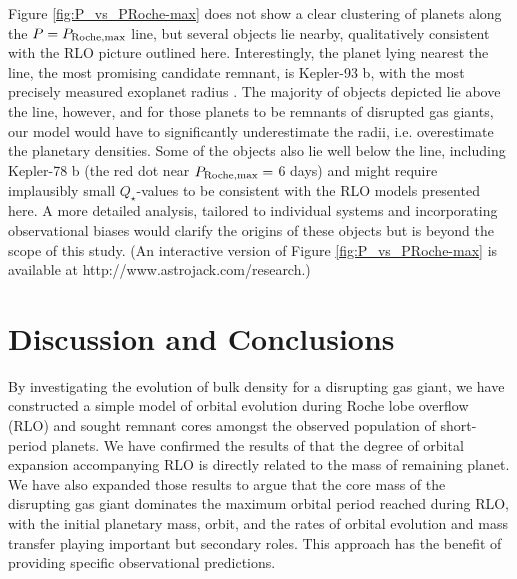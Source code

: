 \documentclass{svjour3}                     %
\begin{document}
Figure \ref{fig:P_vs_PRoche-max} does not show a clear clustering of planets along the $P = P_{\rm Roche, max}$ line, but several objects lie nearby, qualitatively consistent with the RLO picture outlined here. Interestingly, the planet lying nearest the line, the most promising candidate remnant, is Kepler-93 b, with the most precisely measured exoplanet radius \cite{2014ApJ...790...12B}. The majority of objects depicted lie above the line, however, and for those planets to be remnants of disrupted gas giants, our model would have to significantly underestimate the radii, i.e. overestimate the planetary densities. Some of the objects also lie well below the line, including Kepler-78 b (the red dot near $P_{\rm Roche, max} =$ 6 days) and might require implausibly small $Q_\star$-values to be consistent with the RLO models presented here. A more detailed analysis, tailored to individual systems and incorporating observational biases would clarify the origins of these objects but is beyond the scope of this study. (An interactive version of Figure \ref{fig:P_vs_PRoche-max} is available at http://www.astrojack.com/research.)

\section{Discussion and Conclusions}
\label{sec:Discussion_and_Conclusions}
By investigating the evolution of bulk density for a disrupting gas giant, we have constructed a simple model of orbital evolution during Roche lobe overflow (RLO) and sought remnant cores amongst the observed population of short-period planets. We have confirmed the results of \cite{2015ApJ...813..101V} that the degree of orbital expansion accompanying RLO is directly related to the mass of remaining planet. We have also expanded those results to argue that the core mass of the disrupting gas giant dominates the maximum orbital period reached during RLO, with the initial planetary mass, orbit, and the rates of orbital evolution and mass transfer playing important but secondary roles. This approach has the benefit of providing specific observational predictions.
\end{document}
